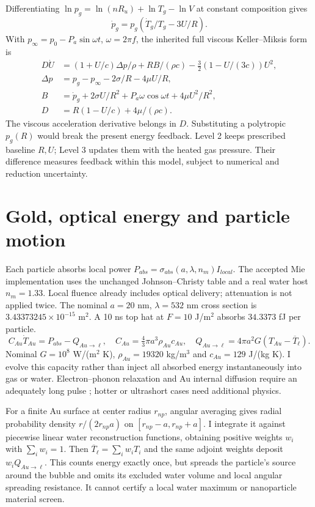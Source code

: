 \documentclass[10pt,letterpaper]{article}
\begin{document}
Differentiating $\ln p_g=\ln(nR_u)+\ln T_g-\ln V$ at constant composition gives
\begin{equation}\dot p_g=p_g(\dot T_g/T_g-3U/R).\end{equation}
With $p_\infty=p_0-P_a\sin\omega t$, $\omega=2\pi f$, the inherited full viscous Keller--Miksis form \cite{km} is
\begin{align}
D\dot U&=(1+U/c)\Delta p/\rho+RB/(\rho c)-\tfrac32(1-U/(3c))U^2,\\
\Delta p&=p_g-p_\infty-2\sigma/R-4\mu U/R,\\
B&=\dot p_g+2\sigma U/R^2+P_a\omega\cos\omega t+4\mu U^2/R^2,\\
D&=R(1-U/c)+4\mu/(\rho c).
\end{align}
The viscous acceleration derivative belongs in $D$. Substituting a polytropic $p_g(R)$ would break the present energy feedback. Level 2 keeps prescribed baseline $R,U$; Level 3 updates them with the heated gas pressure. Their difference measures feedback within this model, subject to numerical and reduction uncertainty.
\clearpage
\section{Gold, optical energy and particle motion}
Each particle absorbs local power $P_{abs}=\sigma_{abs}(a,\lambda,n_m)I_{local}$. The accepted Mie implementation uses the unchanged Johnson--Christy table \cite{jc} and a real water host $n_m=1.33$. Local fluence already includes optical delivery; attenuation is not applied twice. The nominal $a=20$ nm, $\lambda=532$ nm cross section is $3.43373245\times10^{-15}$ m$^2$. A 10 ns top hat at $F=10$ J/m$^2$ absorbs $34.3373$ fJ per particle.
\begin{equation}
C_{Au}\dot T_{Au}=P_{abs}-Q_{Au\to\ell},\quad
C_{Au}=\tfrac43\pi a^3\rho_{Au}c_{Au},\quad
Q_{Au\to\ell}=4\pi a^2G(T_{Au}-\overline T_\ell).
\end{equation}
Nominal $G=10^8$ W/(m$^2$ K), $\rho_{Au}=19320$ kg/m$^3$ and $c_{Au}=129$ J/(kg K). I evolve this capacity rather than inject all absorbed energy instantaneously into gas or water. Electron--phonon relaxation and Au internal diffusion require an adequately long pulse \cite{baffou}; hotter or ultrashort cases need additional physics.

For a finite Au surface at center radius $r_{np}$, angular averaging gives radial probability density $r/(2r_{np}a)$ on $[r_{np}-a,r_{np}+a]$. I integrate it against piecewise linear water reconstruction functions, obtaining positive weights $w_i$ with $\sum_iw_i=1$. Then $\overline T_\ell=\sum_iw_iT_i$ and the same adjoint weights deposit $w_iQ_{Au\to\ell}$. This counts energy exactly once, but spreads the particle's source around the bubble and omits its excluded water volume and local angular spreading resistance. It cannot certify a local water maximum or nanoparticle material screen.
\end{document}

